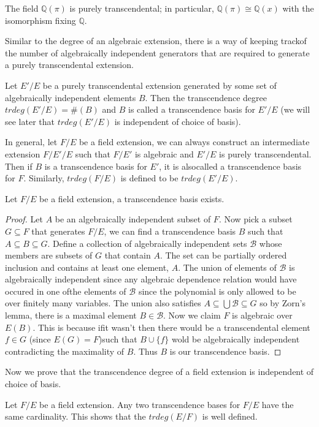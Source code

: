 \begin{example} The field $\mathbb{Q}(\pi)$ is purely transcendental; in
particular, $\mathbb{Q}(\pi)\cong\mathbb{Q}(x)$ with the isomorphism fixing
$\mathbb{Q}$. \end{example}
Similar to the degree of an algebraic extension, there is a way of keeping
trackof the number of algebraically independent generators that are required to
generate a purely transcendental extension.
\begin{definition} Let $E'/E$ be a purely transcendental extension generated by
some set of algebraically independent elements $B$. Then the transcendence
degree $trdeg(E'/E)=\#(B)$ and $B$ is called a transcendence basis for $E'/E$
(we will see later that $trdeg(E'/E)$ is independent of choice of basis).
\end{definition}
In general, let $F/E$ be a field extension, we can always construct an
intermediate extension $F/E'/E$ such that $F/E'$ is algebraic and $E'/E$ is
purely transcendental. Then if $B$ is a transcendence basis for $E'$, it is
alsocalled a transcendence basis for $F$. Similarly, $trdeg(F/E)$ is defined to
be
$trdeg(E'/E)$.
\begin{theorem} Let $F/E$ be a field extension, a transcendence basis exists.
\end{theorem}
\begin{proof} Let $A$ be an algebraically independent subset of $F$. Now pick a
subset $G\subseteq F$ that generates $F/E$, we can find a transcendence basis
$B$ such that $A\subseteq B\subseteq G$. Define a collection of algebraically
independent sets $\mathcal{B}$ whose members are subsets of $G$ that contain
$A$. The set can be partially ordered inclusion and contains at least one
element, $A$. The union of elements of $\mathcal{B}$ is algebraically
independent since any algebraic dependence relation would have occured in one
ofthe elements of $\mathcal{B}$ since the polynomial is only allowed to be over
finitely many variables. The union also satisfies $A\subseteq
\bigcup\mathcal{B}\subseteq G$ so by Zorn's lemma, there is a maximal element
$B\in\mathcal{B}$. Now we claim $F$ is algebraic over $E(B)$. This is because
ifit wasn't then there would be a transcendental element $f\in G$ (since
$E(G)=F$)such that $B\cup\{f\}$ wold be algebraically independent contradicting
the
maximality of $B$. Thus $B$ is our transcendence basis. \end{proof}
Now we prove that the transcendence degree of a field extension is independent
of choice of basis.
\begin{theorem} Let $F/E$ be a field extension. Any two transcendence bases for
$F/E$ have the same cardinality. This shows that the $trdeg(E/F)$ is well
defined. \end{theorem}
